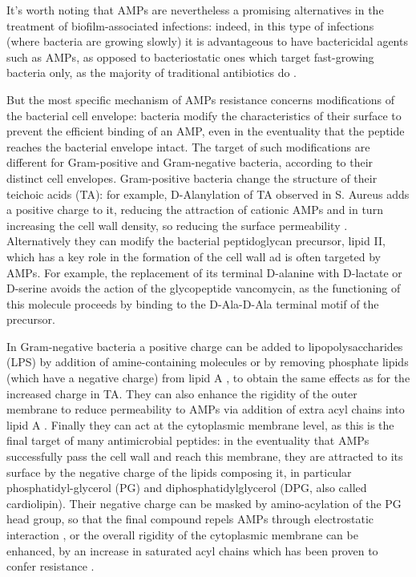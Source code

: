 It's worth noting that AMPs are nevertheless a promising alternatives in the treatment of biofilm-associated infections: indeed, in this type of infections (where bacteria are growing slowly) it is advantageous to have bactericidal agents such as AMPs, as opposed to bacteriostatic ones which target fast-growing bacteria only, as the majority of traditional antibiotics do \cite{Strempel2014}.

But the most specific mechanism of AMPs resistance concerns modifications of the bacterial cell envelope: bacteria modify the characteristics of their surface to prevent the efficient binding of an AMP, even in the eventuality that the peptide reaches the bacterial envelope intact. 
%
The target of such modifications are different for Gram-positive and Gram-negative bacteria, according to their distinct cell envelopes.
%
Gram-positive bacteria change the structure of their teichoic acids (TA): for example, D-Alanylation of TA observed in S. Aureus adds a positive charge to it, reducing the attraction of cationic AMPs and in turn increasing the cell wall density, so reducing the surface permeability \cite{Saar-Dover2012}.
%
Alternatively they can modify the bacterial peptidoglycan precursor, lipid II, which has a key role in the formation of the cell wall ad is often targeted by AMPs. For example, the replacement of its terminal D-alanine with D-lactate or D-serine \cite{Bugg1991} avoids the action of the glycopeptide vancomycin, as the functioning of this molecule proceeds by binding to the D-Ala-D-Ala terminal motif of the precursor.

In Gram-negative bacteria a positive charge can be added to lipopolysaccharides (LPS) by addition of amine-containing molecules \cite{Moskowitz2004} or by removing phosphate lipids (which have a negative charge) from lipid A \cite{Wang2006lpx}, to obtain the same effects as for the increased charge in TA.
%
They can also enhance the rigidity of the outer membrane to reduce permeability to AMPs via addition of extra acyl chains into lipid A \cite{Guo1998}.
%
Finally they can act at the cytoplasmic membrane level, as this is the final target of many antimicrobial peptides: in the eventuality that AMPs successfully pass the cell wall and reach this membrane, they are attracted to its surface by the negative charge of the lipids composing it, in particular phosphatidyl-glycerol (PG) and diphosphatidylglycerol (DPG, also called cardiolipin). Their negative charge can be masked by amino-acylation of the PG head group, so that the final compound repels AMPs through electrostatic interaction \cite{Peschel2001}, or the overall rigidity of the cytoplasmic membrane can be enhanced, by an increase in saturated acyl chains which has been proven to confer resistance \cite{Kumariya2015}.

